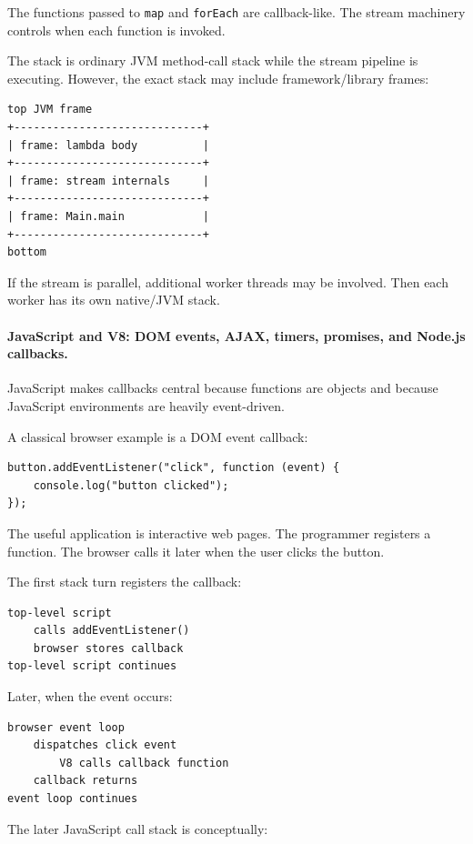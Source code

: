 \documentclass[a4paper,twoside]{report}
\begin{document}
The functions passed to \texttt{map} and \texttt{forEach} are callback-like. The stream machinery controls when each function is invoked.

The stack is ordinary JVM method-call stack while the stream pipeline is executing. However, the exact stack may include framework/library frames:

\begin{verbatim}
top JVM frame
+-----------------------------+
| frame: lambda body          |
+-----------------------------+
| frame: stream internals     |
+-----------------------------+
| frame: Main.main            |
+-----------------------------+
bottom
\end{verbatim}

If the stream is parallel, additional worker threads may be involved. Then each worker has its own native/JVM stack.

\paragraph{JavaScript and V8: DOM events, AJAX, timers, promises, and Node.js callbacks.}

JavaScript makes callbacks central because functions are objects and because JavaScript environments are heavily event-driven.

A classical browser example is a DOM event callback:

\begin{verbatim}
button.addEventListener("click", function (event) {
    console.log("button clicked");
});
\end{verbatim}

The useful application is interactive web pages. The programmer registers a function. The browser calls it later when the user clicks the button.

The first stack turn registers the callback:

\begin{verbatim}
top-level script
    calls addEventListener()
    browser stores callback
top-level script continues
\end{verbatim}

Later, when the event occurs:

\begin{verbatim}
browser event loop
    dispatches click event
        V8 calls callback function
    callback returns
event loop continues
\end{verbatim}

The later JavaScript call stack is conceptually:
\end{document}
